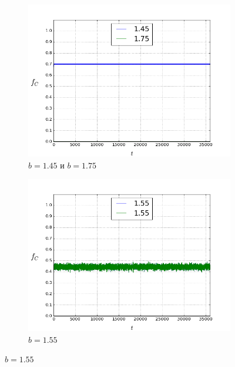 \documentclass[a4paper]{article}
\begin{document}
\begin{figure}
	\ContinuedFloat
	\begin{subfigure}{.5\textwidth}
		\includegraphics[width=.8\linewidth]{145-175.png}
		\caption{$b=1.45$ и $b=1.75$}
	\end{subfigure}
	\begin{subfigure}{.5\textwidth}
		\includegraphics[width=.8\linewidth]{155-155.png}
		\caption{$b=1.55$}
	\end{subfigure}%
	

\end{figure}
\end{document}
